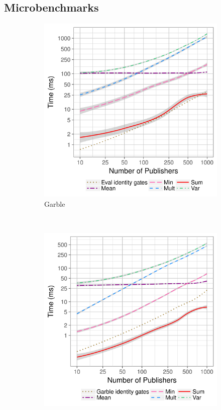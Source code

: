 \vspace{-10pt}
\subsection{Microbenchmarks}

\begin{figure}[ht]
    \centering
    \begin{subfigure}[b]{0.32\textwidth}
        \includegraphics[width=\textwidth]{plots/garble_loglog.png}
        \caption{Garble}
        \label{fig:micro-garble-time}
    \end{subfigure}
    ~ %
    \begin{subfigure}[b]{0.32\textwidth}
        \includegraphics[width=\textwidth]{plots/eval_loglog.png}

\end{subfigure}
\end{figure}
